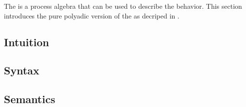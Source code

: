 The \findex[\picalc{}|(]{\picalc{}} is a process algebra that can be used to describe the behavior. This section introduces the pure polyadic version of the \picalc{} as decriped in \cite{milner}. 


\subsection{Intuition}
\label{sec_pi_intuition}


\subsection{Syntax}
\label{sec_pi_syntax}


\subsection{Semantics}
\label{sec_pi_sem}


\newpage %
